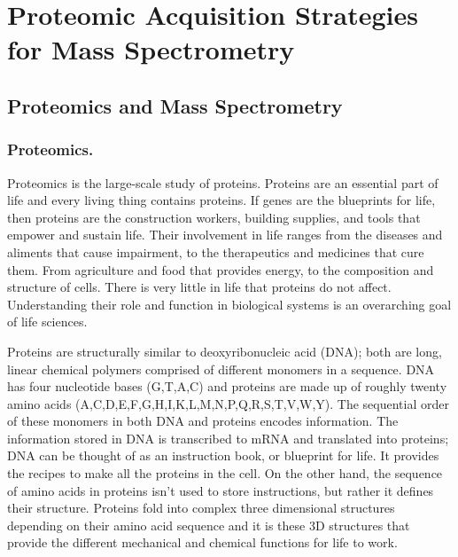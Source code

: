 \chapter{Proteomic Acquisition Strategies for Mass Spectrometry}

\section{Proteomics and Mass Spectrometry}

\subsection{Proteomics.}
Proteomics is the large-scale study of proteins. Proteins are an essential part of life and every living thing contains proteins. If genes are the blueprints for life, then proteins are the construction workers, building supplies, and tools that empower and sustain life. Their involvement in life ranges from the diseases and aliments that cause impairment, to the therapeutics and medicines that cure them. From agriculture and food that provides energy, to the composition and structure of cells. There is very little in life that proteins do not affect. Understanding their role and function in biological systems is an overarching goal of life sciences. 

Proteins are structurally similar to deoxyribonucleic acid (DNA); both are long, linear chemical polymers comprised of different monomers in a sequence. DNA has four nucleotide bases (G,T,A,C) and proteins are made up of roughly twenty amino acids (A,C,D,E,F,G,H,I,K,L,M,N,P,Q,R,S,T,V,W,Y). The sequential order of these monomers in both DNA and proteins encodes information. The information stored in DNA is transcribed to mRNA and translated into proteins; DNA can be thought of as an instruction book, or blueprint for life. It provides the recipes to make all the proteins in the cell. On the other hand, the sequence of amino acids in proteins isn't used to store instructions, but rather it defines their structure. Proteins fold into complex three dimensional structures depending on their amino acid sequence and it is these 3D structures that provide the different mechanical and chemical functions for life to work.

